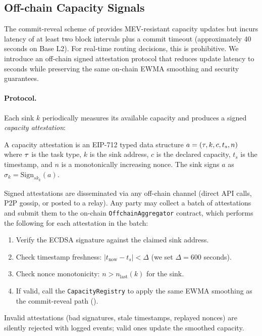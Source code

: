 \subsection{Off-chain Capacity Signals}
\label{sec:offchain}

The commit-reveal scheme of  provides MEV-resistant capacity
updates but incurs latency of at least two block intervals plus a commit timeout
(approximately 40 seconds on Base L2). For real-time routing decisions, this
is prohibitive. We introduce an off-chain signed attestation protocol that
reduces update latency to seconds while preserving the same on-chain
EWMA smoothing and security guarantees.

\paragraph{Protocol.}
Each sink $k$ periodically measures its available capacity and produces a
signed \emph{capacity attestation}:

\begin{definition}
A capacity attestation is an EIP-712 typed data structure
$a = (\tau, k, c, t_s, n)$ where $\tau$ is the task type,
$k$ is the sink address, $c$ is the declared capacity, $t_s$ is the
timestamp, and $n$ is a monotonically increasing nonce.
The sink signs $a$ as $\sigma_k = \mathrm{Sign}_{sk_k}(a)$.
\end{definition}

Signed attestations are disseminated via any off-chain channel (direct
API calls, P2P gossip, or posted to a relay). Any party may collect a batch
of attestations and submit them to the on-chain \texttt{OffchainAggregator}
contract, which performs the following for each attestation in the batch:

\begin{enumerate}
    \item Verify the ECDSA signature against the claimed sink address.
    \item Check timestamp freshness: $|t_{\text{now}} - t_s| < \Delta$
        (we set $\Delta = 600$ seconds).
    \item Check nonce monotonicity: $n > n_{\text{last}}(k)$ for the sink.
    \item If valid, call the \texttt{CapacityRegistry} to apply the same EWMA
        smoothing as the commit-reveal path ().
\end{enumerate}

Invalid attestations (bad signatures, stale timestamps, replayed nonces) are
silently rejected with logged events; valid ones update the smoothed capacity.

